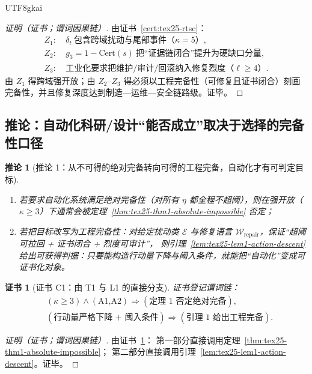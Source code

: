 \documentclass[12pt]{article}
\newtheorem{corollary}{推论}[section]
\newtheorem{Certificate}{证书}[section]
\newcommand{\Cert}{\ensuremath{\mathrm{Cert}}}
\begin{document}
\begin{CJK*}{UTF8}{gkai}
\begin{proof}[证明（证书；谓词因果链）]
由证书~\ref{cert:tex25-rtsc}：
\[
  \begin{aligned}
    Z_1:&\ \delta_t\ \text{包含跨域扰动与尾部事件（}\kappa=5\text{）},\\
    Z_2:&\ g_3=1-\Cert(s)\ \text{把“证据链闭合”提升为硬缺口分量},\\
    Z_3:&\ \text{工业化要求把维护/审计/回滚纳入修复烈度（}\ell\ge 4\text{）}.
  \end{aligned}
\]
由 $Z_1$ 得跨域强开放；由 $Z_2$--$Z_3$ 得必须以工程完备性（可修复且证书闭合）刻画完备性，并且修复深度达到制造—运维—安全链路级。证毕。
\end{proof}

\subsection{推论：自动化科研/设计“能否成立”取决于选择的完备性口径}
\label{subsec:tex25-corollary}

\begin{corollary}[推论 1：从不可得的绝对完备转向可得的工程完备，自动化才有可判定目标]
\label{cor:tex25-cor1}
\begin{enumerate}
  \item 若要求自动化系统满足绝对完备性（对所有 $\eta$ 都全程不超阈），则在强开放（$\kappa\ge 3$）下通常会被定理~\ref{thm:tex25-thm1-absolute-impossible} 否定；
  \item 若把目标改写为工程完备性：对给定扰动类 $\mathcal{E}$ 与修复语言 $\mathcal{W}_{\mathrm{repair}}$，保证“超阈可拉回 + 证书闭合 + 烈度可审计”，
  则引理~\ref{lem:tex25-lem1-action-descent} 给出可获得判据：只要能构造行动量下降与阈入条件，就能把“自动化”变成可证书化对象。
\end{enumerate}
\end{corollary}

\begin{Certificate}[证书 C1：由 T1 与 L1 的直接分支]
\label{cert:tex25-cor1}
证书登记谓词链：
\[
  \begin{aligned}
    &(\kappa\ge 3)\wedge(\text{A1,A2})\Rightarrow (\text{定理 1 否定绝对完备}),
    \\
    &(\text{行动量严格下降 + 阈入条件})\Rightarrow(\text{引理 1 给出工程完备}).
  \end{aligned}
\]
\end{Certificate}

\begin{proof}[证明（证书；谓词因果链）]
由证书~\ref{cert:tex25-cor1}：
第一部分直接调用定理~\ref{thm:tex25-thm1-absolute-impossible}；
第二部分直接调用引理~\ref{lem:tex25-lem1-action-descent}。证毕。
\end{proof}


\end{CJK*}
\end{document}
